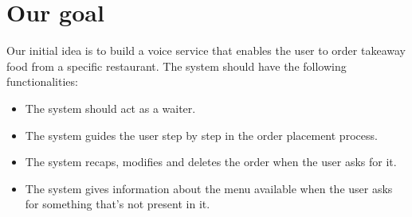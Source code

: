 \section{Our goal}

Our initial idea is to build a voice service that enables the user
to order takeaway food from a specific restaurant.
The system should have the following functionalities:

\begin{itemize}
    
    \item The system should act as a waiter.
    \item The system guides the user step by step in the order placement process.
    \item The system recaps, modifies and deletes the order when the user asks for it.
    \item The system gives information about the menu available when the user asks for something that's not present in it.

\end{itemize}